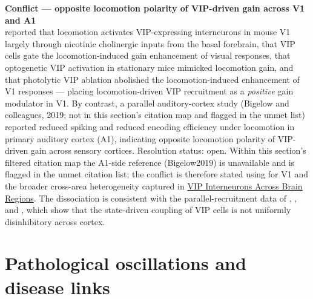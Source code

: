 \documentclass[11pt]{article}
\begin{document}
\begin{framed}
\textbf{Conflict --- opposite locomotion polarity of VIP-driven gain across V1 and A1}\\
\citet{Fu2014} reported that locomotion activates VIP-expressing interneurons in mouse V1 largely through nicotinic cholinergic inputs from the basal forebrain, that VIP cells gate the locomotion-induced gain enhancement of visual responses, that optogenetic VIP activation in stationary mice mimicked locomotion gain, and that photolytic VIP ablation abolished the locomotion-induced enhancement of V1 responses --- placing locomotion-driven VIP recruitment as a \textit{positive} gain modulator in V1. By contrast, a parallel auditory-cortex study (Bigelow and colleagues, 2019; not in this section's citation map and flagged in the unmet list) reported reduced spiking and reduced encoding efficiency under locomotion in primary auditory cortex (A1), indicating opposite locomotion polarity of VIP-driven gain across sensory cortices. Resolution status: open. Within this section's filtered citation map the A1-side reference (Bigelow2019) is unavailable and is flagged in the unmet citation list; the conflict is therefore stated using \citet{Fu2014} for V1 and the broader cross-area heterogeneity captured in \href{/cross-areas}{VIP Interneurons Across Brain Regions}. The dissociation is consistent with the parallel-recruitment data of \citet{Pakan2016}, \citet{Dipoppa2018}, and \citet{Kuchibhotla2017}, which show that the state-driven coupling of VIP cells is not uniformly disinhibitory across cortex.
\end{framed}

\section{Pathological oscillations and disease links}
\end{document}
